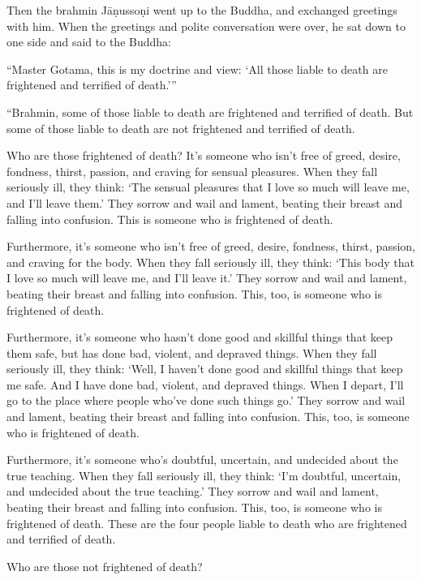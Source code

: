 \documentclass[12pt,openany]{book}%
\begin{document}
Then the brahmin \textsanskrit{Jāṇussoṇi} went up to the Buddha, and exchanged greetings with him. When the greetings and polite conversation were over, he sat down to one side and said to the Buddha: 

“Master Gotama, this is my doctrine and view: ‘All those liable to death are frightened and terrified of death.’” 

“Brahmin, some of those liable to death are frightened and terrified of death. But some of those liable to death are not frightened and terrified of death. 

Who are those frightened of death? It’s someone who isn’t free of greed, desire, fondness, thirst, passion, and craving for sensual pleasures. When they fall seriously ill, they think: ‘The sensual pleasures that I love so much will leave me, and I’ll leave them.’ They sorrow and wail and lament, beating their breast and falling into confusion. This is someone who is frightened of death. 

Furthermore, it’s someone who isn’t free of greed, desire, fondness, thirst, passion, and craving for the body. When they fall seriously ill, they think: ‘This body that I love so much will leave me, and I’ll leave it.’ They sorrow and wail and lament, beating their breast and falling into confusion. This, too, is someone who is frightened of death. 

Furthermore, it’s someone who hasn’t done good and skillful things that keep them safe, but has done bad, violent, and depraved things. When they fall seriously ill, they think: ‘Well, I haven’t done good and skillful things that keep me safe. And I have done bad, violent, and depraved things. When I depart, I’ll go to the place where people who’ve done such things go.’ They sorrow and wail and lament, beating their breast and falling into confusion. This, too, is someone who is frightened of death. 

Furthermore, it’s someone who’s doubtful, uncertain, and undecided about the true teaching. When they fall seriously ill, they think: ‘I’m doubtful, uncertain, and undecided about the true teaching.’ They sorrow and wail and lament, beating their breast and falling into confusion. This, too, is someone who is frightened of death. These are the four people liable to death who are frightened and terrified of death. 

Who are those not frightened of death? 
\end{document}
